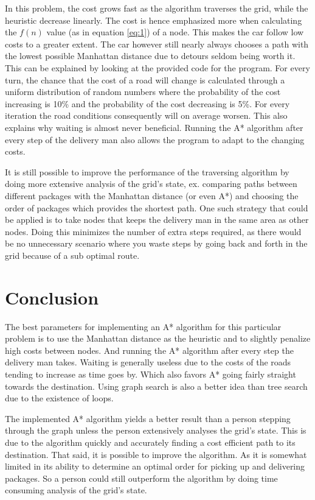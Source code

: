 \documentclass[12pt, a4paper]{article}
\begin{document}
In this problem, the cost grows fast as the algorithm traverses the grid, while the heuristic decrease linearly. The cost is hence emphasized more when calculating the $f(n)$ value (as in equation \ref{eq:1}) of a node. This makes the car follow low costs to a greater extent. The car however still nearly always chooses a path with the lowest possible Manhattan distance due to detours seldom being worth it. This can be explained by looking at the provided code for the program. For every turn, the chance that the cost of a road will change is calculated through a uniform distribution of random numbers where the probability of the cost increasing is 10\% and the probability of the cost decreasing is 5\%. For every iteration the road conditions consequently will on average worsen. This also explains why waiting is almost never beneficial. Running the A* algorithm after every step of the delivery man also allows the program to adapt to the changing costs.

It is still possible to improve the performance of the traversing algorithm by doing more extensive analysis of the grid's state, ex. comparing paths between different packages with the Manhattan distance (or even A*) and choosing the order of packages which provides the shortest path. One such strategy that could be applied is to take nodes that keeps the delivery man in the same area as other nodes. Doing this minimizes the number of extra steps required, as there would be no unnecessary scenario where you waste steps by going back and forth in the grid because of a sub optimal route.

\section{Conclusion}

The best parameters for implementing an A* algorithm for this particular problem is to use the Manhattan distance as the heuristic and to slightly penalize high costs between nodes. And running the A* algorithm after every step the delivery man takes. Waiting is generally useless due to the costs of the roads tending to increase as time goes by. Which also favors A* going fairly straight towards the destination. Using graph search is also a better idea than tree search due to the existence of loops.

The implemented A* algorithm yields a better result than a person stepping through the graph unless the person extensively analyses the grid's state. This is due to the algorithm quickly and accurately finding a cost efficient path to its destination. That said, it is possible to improve the algorithm. As it is somewhat limited in its ability to determine an optimal order for picking up and delivering packages. So a person could still outperform the algorithm by doing time consuming analysis of the grid's state.


\raggedright
{}

\end{document}
